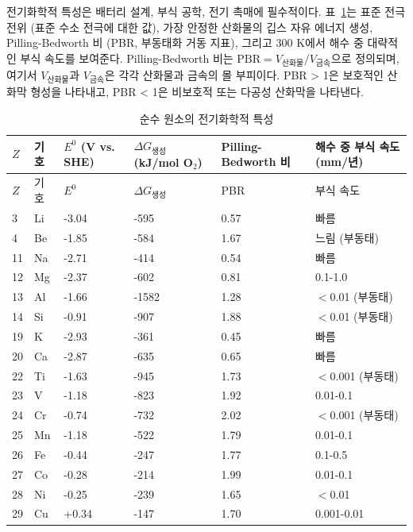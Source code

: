 \documentclass[12pt,a4paper]{article}
\begin{document}
	전기화학적 특성은 배터리 설계, 부식 공학, 전기 촉매에 필수적이다. 표~\ref{tab:electrochemical-properties-func}는 표준 전극 전위 (표준 수소 전극에 대한 값), 가장 안정한 산화물의 깁스 자유 에너지 생성, Pilling-Bedworth 비 (PBR, 부동태화 거동 지표), 그리고 300 K에서 해수 중 대략적인 부식 속도를 보여준다. Pilling-Bedworth 비는 \(\text{PBR} = V_{\text{산화물}} / V_{\text{금속}}\)으로 정의되며, 여기서 \(V_{\text{산화물}}\)과 \(V_{\text{금속}}\)은 각각 산화물과 금속의 몰 부피이다. PBR > 1은 보호적인 산화막 형성을 나타내고, PBR < 1은 비보호적 또는 다공성 산화막을 나타낸다.
	
	\begin{longtable}{p{0.8cm}p{1.2cm}p{2.5cm}p{2.5cm}p{2.5cm}p{2.5cm}}
		\caption{순수 원소의 전기화학적 특성} \label{tab:electrochemical-properties-func} \\
		\toprule
		\(Z\) & 기호 & \(E^0\) (V vs. SHE) & \(\Delta G_{\text{생성}}\) (kJ/mol O\(_2\)) & Pilling-Bedworth 비 & 해수 중 부식 속도 (mm/년) \\
		\midrule
		\endfirsthead
		\toprule
		\(Z\) & 기호 & \(E^0\) & \(\Delta G_{\text{생성}}\) & PBR & 부식 속도 \\
		\midrule
		\endhead
		3  & Li & -3.04 & -595 & 0.57 & 빠름 \\
		4  & Be & -1.85 & -584 & 1.67 & 느림 (부동태) \\
		11 & Na & -2.71 & -414 & 0.54 & 빠름 \\
		12 & Mg & -2.37 & -602 & 0.81 & 0.1-1.0 \\
		13 & Al & -1.66 & -1582 & 1.28 & $<$0.01 (부동태) \\
		14 & Si & -0.91 & -907 & 1.88 & $<$0.01 (부동태) \\
		19 & K  & -2.93 & -361 & 0.45 & 빠름 \\
		20 & Ca & -2.87 & -635 & 0.65 & 빠름 \\
		22 & Ti & -1.63 & -945 & 1.73 & $<$0.001 (부동태) \\
		23 & V  & -1.18 & -823 & 1.92 & 0.01-0.1 \\
		24 & Cr & -0.74 & -732 & 2.02 & $<$0.001 (부동태) \\
		25 & Mn & -1.18 & -522 & 1.79 & 0.01-0.1 \\
		26 & Fe & -0.44 & -247 & 1.77 & 0.1-0.5 \\
		27 & Co & -0.28 & -214 & 1.99 & 0.01-0.1 \\
		28 & Ni & -0.25 & -239 & 1.65 & $<$0.01 \\
		29 & Cu & +0.34 & -147 & 1.70 & 0.001-0.01 \\

\end{longtable}
\end{document}
